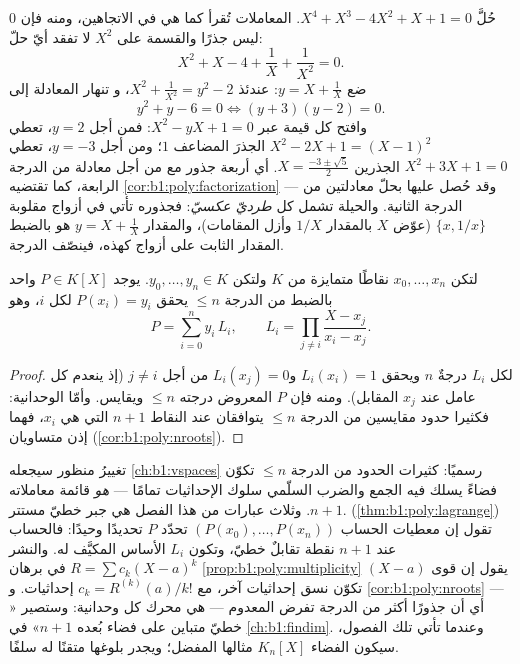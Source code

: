 \begin{example}\label{ex:b1:poly:palindrome}
حُلَّ $X^4 + X^3 - 4X^2 + X + 1 = 0$. المعاملات تُقرأ
كما هي في الاتجاهين، ومنه فإن $0$ ليس جذرًا والقسمة على
$X^2$ لا تفقد أيّ حلّ:
\[
X^2 + X - 4 + \frac1X + \frac1{X^2} = 0 .
\]
ضع $y = X + \frac1X$: عندئذ $X^2 + \frac1{X^2} = y^2 - 2$، و
تنهار المعادلة إلى
\[
y^2 + y - 6 = 0 \iff (y + 3)(y - 2) = 0 .
\]
وافتح كل قيمة عبر $X^2 - yX + 1 = 0$: فمن أجل $y = 2$، تعطي $X^2 -
2X + 1 = (X - 1)^2$ الجذرَ المضاعف $1$؛ ومن أجل $y = -3$،
تعطي $X^2 + 3X + 1 = 0$ الجذرين $X = \frac{-3 \pm \sqrt5}2$. أي أربعة جذور
مع  من أجل معادلة من الدرجة الرابعة، كما تقتضيه
\cref{cor:b1:poly:factorization} --- وقد حُصل عليها بحلّ
معادلتين من الدرجة الثانية. والحيلة تشمل كل 
\emph{طرديّ عكسيّ}: فجذوره تأتي في أزواج مقلوبة $\{x, 1/x\}$
(عوّض $X$ بالمقدار $1/X$ وأزل المقامات)، والمقدار $y = X +
\frac1X$ هو بالضبط المقدار الثابت على أزواج كهذه،
فينصّف الدرجة.
\end{example}

\begin{theorem}\label{thm:b1:poly:lagrange}
لتكن $x_0, \dots, x_n$ نقاطًا متمايزة من $K$ ولتكن $y_0, \dots, y_n
\in K$. يوجد $P \in K[X]$ واحد بالضبط من الدرجة $\leq n$ يحقق
$P(x_i) = y_i$ لكل $i$، وهو
\[
P = \sum_{i=0}^{n} y_i\, L_i,
\qquad
L_i = \prod_{j \neq i} \frac{X - x_j}{x_i - x_j} .
\]
\end{theorem}

\begin{proof}
لكل $L_i$ درجةٌ $n$ ويحقق $L_i(x_i) = 1$ و$L_i(x_j) =
0$ من أجل $j \neq i$ (إذ ينعدم كل عامل عند $x_j$ المقابل).
ومنه فإن $P$ المعروض درجته $\leq n$ ويقايس. وأمّا الوحدانية:
فكثيرا حدود مقايسين من الدرجة $\leq n$ يتوافقان عند النقاط $n+1$
التي هي $x_i$، فهما إذن متساويان (\cref{cor:b1:poly:nroots}).
\end{proof}

\begin{remark}\label{rem:b1:poly:interlude}
تغييرُ منظور سيجعله \cref{ch:b1:vspaces} رسميًا:
كثيرات الحدود من الدرجة $\leq n$ تكوّن فضاءً يسلك فيه
الجمع والضرب السلّمي سلوك الإحداثيات تمامًا ---
 \emph{هو} قائمة معاملاته $n + 1$. وثلاث
عبارات من هذا الفصل هي جبر خطيّ مستتر.
 (\cref{thm:b1:poly:lagrange}) تقول إن
معطيات الحساب $(P(x_0), \dots, P(x_n))$ تحدّد $P$
تحديدًا وحيدًا: فالحساب عند $n + 1$ نقطة تقابلٌ خطيّ،
وتكون $L_i$ الأساس المكيَّف له. والنشر $R =
\sum c_k(X - a)^k$ في برهان
\cref{prop:b1:poly:multiplicity} يقول إن قوى
$(X - a)$ تكوّن نسق إحداثيات آخر، مع $c_k =
R^{(k)}(a)/k!$ إحداثيات. و
\cref{cor:b1:poly:nroots} --- أي أن جذورًا أكثر من الدرجة تفرض
 المعدوم --- هي محرك كل وحدانية: وستصير
« خطيّ متباين على فضاء بُعده $n + 1$»
في \cref{ch:b1:findim}. وعندما تأتي تلك الفصول، سيكون الفضاء
$K_n[X]$ مثالها المفضل؛ ويجدر بلوغها متقنًا له سلفًا.
\end{remark}

